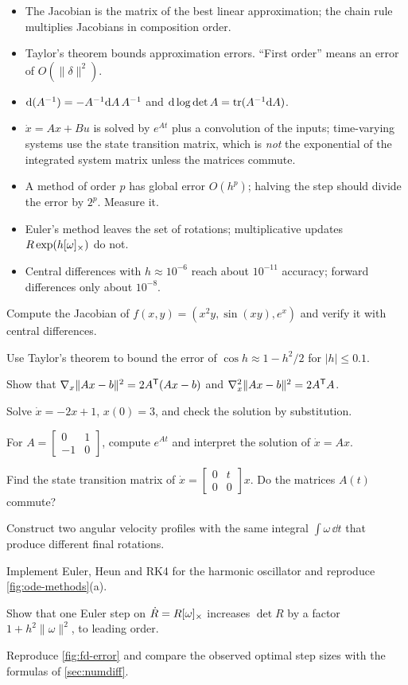 \begin{takeaways}
\begin{itemize}
  \item The Jacobian is the matrix of the best linear approximation; the chain rule multiplies Jacobians in composition order.
  \item Taylor's theorem bounds approximation errors. ``First order'' means an error of $O(\|\delta\|^2)$.
  \item $\mathrm{d}(A^{-1}) = -A^{-1}\mathrm{d} A\,A^{-1}$ and $\mathrm{d}\log\det A = \operatorname{tr}(A^{-1}\mathrm{d} A)$.
  \item $\dot x = Ax + Bu$ is solved by $e^{At}$ plus a convolution of the inputs; time-varying systems use the state transition matrix,
        which is \emph{not} the exponential of the integrated system matrix unless the matrices commute.
  \item A method of order $p$ has global error $O(h^p)$; halving the step should divide the error by $2^p$. Measure it.
  \item Euler's method leaves the set of rotations; multiplicative updates $R\exp(h[\omega]_{\times})$ do not.
  \item Central differences with $h \approx 10^{-6}$ reach about $10^{-11}$ accuracy; forward differences only about $10^{-8}$.
\end{itemize}
\end{takeaways}

\begin{exercises}
  \item Compute the Jacobian of $f(x, y) = (x^2y, \sin(xy), e^x)$ and verify it with central differences.
  \item Use Taylor's theorem to bound the error of $\cos h \approx 1 - h^2/2$ for $|h| \le 0.1$.
  \item Show that $\nabla_x\|Ax - b\|^2 = 2A^{\mathsf{T}}(Ax - b)$ and $\nabla_x^2\|Ax - b\|^2 = 2A^{\mathsf{T}} A$.
  \item Solve $\dot x = -2x + 1$, $x(0) = 3$, and check the solution by substitution.
  \item For $A = \begin{bmatrix}0 & 1\\ -1 & 0\end{bmatrix}$, compute $e^{At}$ and interpret the solution of $\dot x = Ax$.
  \item Find the state transition matrix of $\dot x = \begin{bmatrix}0 & t\\0 & 0\end{bmatrix}x$. Do the matrices $A(t)$ commute?
  \item Construct two angular velocity profiles with the same integral $\int\omega\,\dd t$ that produce different final rotations.
  \item Implement Euler, Heun and RK4 for the harmonic oscillator and reproduce \cref{fig:ode-methods}(a).
  \item Show that one Euler step on $\dot R = R[\omega]_{\times}$ increases $\det R$ by a factor $1 + h^2\|\omega\|^2$, to leading order.
  \item Reproduce \cref{fig:fd-error} and compare the observed optimal step sizes with the formulas of \cref{sec:numdiff}.
\end{exercises}

